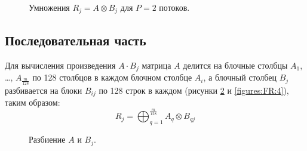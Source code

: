 \documentclass[a4paper,12pt]{report}
\begin{document}
\begin{figure}
	\caption{Умножения $R_j = A \otimes B_j$ для $P = 2$ потоков.}
	\label{figures:FR:2}
\end{figure}

\subsection{Последовательная часть}

Для вычисления произведения $A \cdot B_j$ матрица $A$ делится на блочные столбцы $A_1$, \ldots, $A_{\frac{m}{128}}$ по 128 столбцов в каждом блочном столбце $A_i$, а блочный
столбец $B_j$ разбивается на блоки $B_{ij}$ по 128 строк в каждом (рисунки \ref{figures:FR:3} и \ref{figures:FR:4}), таким образом:
$$
	R_j = \bigoplus_{q=1}^{\frac{m}{128}} A_q \otimes B_{qj}
$$

\begin{figure}
	\caption{Разбиение $A$ и $B_j$.}
	\label{figures:FR:3}
\end{figure}
\end{document}
